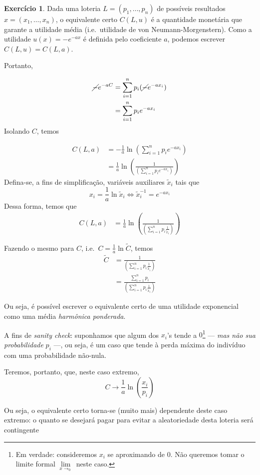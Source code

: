 \documentclass[12pt]{article}
\numberwithin{equation}{section}
\theoremstyle{plain}
\theoremstyle{definition}
\newtheorem{exercise}{Exercício}[section]
\theoremstyle{remark}
\begin{document}
\begin{exercise}
Dada uma loteria \(L = (p_{1},\dots,p_{n})\) de possíveis resultados
\(x=(x_{1},\dots,x_{n})\), o equivalente certo \(C(L, u)\) é a
quantidade monetária que garante a utilidade média (i.e.~utilidade de
von Neumann-Morgenstern). Como a utilidade \(u(x) = - e^{-ax}\) é
definida pelo coeficiente \(a\), podemos escrever \(C(L, u) = C(L, a)\).

Portanto,

\begin{align*}
\cancel{ - }e^{-aC} &= \sum \limits_{i=1}^{n} p_{i} (\cancel{ - }e^{-ax_{i}}) \\
&= \sum \limits_{i=1}^{n} p_{i} e^{-ax_{i}}
\end{align*} Isolando \(C\), temos

\begin{align*}
C(L, a) &= -\frac{1}{a} \ln\left( \sum \limits_{i=1}^{n}p_{i} e^{-ax_{i}} \right) \\
&= \frac{1}{a}\ln \left( \frac{1}{\left( \sum \limits_{i=1}^{n}p_{i} e^{-ax_{i}} \right)} \right)
\end{align*} Defina-se, a fins de simplificação, variáveis auxiliares
\(\tilde{x}_{i}\) tais que
\[
x_{i} = \frac{1}{a} \ln \tilde{x}_{i} \iff \tilde{x}_{i}^{-1} = e^{-ax_{i}}
\]
Dessa forma, temos que \begin{align*}
C(L, a) &= \frac{1}{a}  \ln \left( \frac{1}{\left( \sum \limits_{i=1}^{n}p_{i} \frac{1}{\tilde{x}_{i}} \right)} \right) 
\end{align*}

Fazendo o mesmo para \(C\), i.e.~\(C = \frac{1}{a}\ln \tilde{C}\), temos
\begin{align*}
\tilde{C} &= \frac{1}{\left( \sum \limits_{i=1}^{n}p_{i} \frac{1}{\tilde{x}_{i}} \right)}  \\
&= \frac{\sum \limits_{i=1}^{n} p_{i}}{\left( \sum \limits_{i=1}^{n}p_{i} \frac{1}{\tilde{x}_{i}} \right)} 
\end{align*}

Ou seja, é possível escrever o equivalente certo de uma utilidade
exponencial como uma média \textit{harmônica ponderada}.

A fins de \textit{sanity check}: suponhamos que algum dos \(x_{i}\)'s
tende a \(0\)\footnote{Em verdade: consideremos \(x_{i}\) se aproximando
  de \(0\). Não queremos tomar o limite formal
  \(\lim\limits_{x\to_{0}}\) neste caso.} --- \textit{mas não sua
probabilidade} \(p_i\) ---, ou seja, é um caso que tende à perda máxima
do indivíduo com uma probabilidade não-nula.

Teremos, portanto, que, neste caso extremo,
\[
C \to \frac{1}{a}  \ln \left( \frac{x_{i}}{p_{i}}\right) 
\]

Ou seja, o equivalente certo torna-se (muito mais) dependente deste caso
extremo: o quanto se desejará pagar para evitar a aleatoriedade desta
loteria será contingente
\end{exercise}
\end{document}
